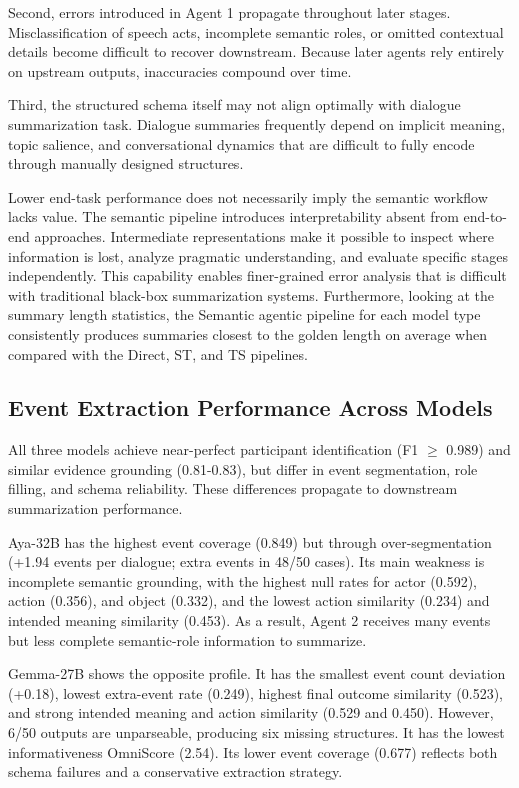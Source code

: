 \documentclass[11pt]{article}
\begin{document}
Second, errors introduced in Agent 1 propagate throughout later stages. Misclassification of speech acts, incomplete semantic roles, or omitted contextual details become difficult to recover downstream. Because later agents rely entirely on upstream outputs, inaccuracies compound over time.

Third, the structured schema itself may not align optimally with dialogue summarization task. Dialogue summaries frequently depend on implicit meaning, topic salience, and conversational dynamics that are difficult to fully encode through manually designed structures.

Lower end-task performance does not necessarily imply the semantic workflow lacks value. The semantic pipeline introduces interpretability absent from end-to-end approaches. Intermediate representations make it possible to inspect where information is lost, analyze pragmatic understanding, and evaluate specific stages independently. This capability enables finer-grained error analysis that is difficult with traditional black-box summarization systems. Furthermore, looking at the summary length statistics, the Semantic agentic pipeline for each model type consistently produces summaries closest to the golden length on average when compared with the Direct, ST, and TS pipelines.

\subsection{Event Extraction Performance Across Models}

All three models achieve near-perfect participant identification (F1 $\geq$ 0.989) and similar evidence grounding (0.81-0.83), but differ in event segmentation, role filling, and schema reliability. These differences propagate to downstream summarization performance.

Aya-32B has the highest event coverage (0.849) but through over-segmentation (+1.94 events per dialogue; extra events in 48/50 cases). Its main weakness is incomplete semantic grounding, with the highest null rates for actor (0.592), action (0.356), and object (0.332), and the lowest action similarity (0.234) and intended meaning similarity (0.453). As a result, Agent 2 receives many events but less complete semantic-role information to summarize.

Gemma-27B shows the opposite profile. It has the smallest event count deviation (+0.18), lowest extra-event rate (0.249), highest final outcome similarity (0.523), and strong intended meaning and action similarity (0.529 and 0.450). However, 6/50 outputs are unparseable, producing six missing structures. It has the lowest informativeness OmniScore (2.54). Its lower event coverage (0.677) reflects both schema failures and a conservative extraction strategy.
\end{document}
